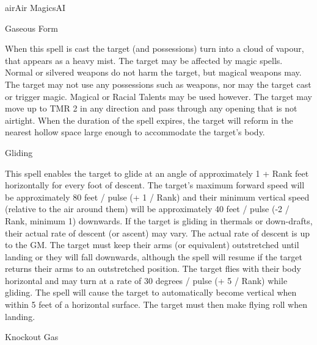 \begin{college}[2.1]{air}{Air Magics}{AI}
\begin{spell}[S-7]{Gaseous Form}

\begin{effects}
When this spell is cast the target (and possessions) turn into a cloud
of vapour, that appears as a heavy mist. The target may be affected by
magic spells. Normal or silvered weapons do not harm the target, but
magical weapons may. The target may not use any possessions such as
weapons, nor may the target cast or trigger magic. Magical or Racial
Talents may be used however. The target may move up to TMR 2 in any
direction and pass through any opening that is not airtight. When the
duration of the spell expires, the target will reform in the nearest
hollow space large enough to accommodate the target's body.
\end{effects}
\end{spell}

\begin{spell}[S-8]{Gliding}

\begin{effects}
This spell enables the target to glide at an angle of approximately 1
+ Rank feet horizontally for every foot of descent. The target's
maximum forward speed will be approximately 80 feet / pulse (+ 1 /
Rank) and their minimum vertical speed (relative to the air around
them) will be approximately 40 feet / pulse (-2 / Rank, minimum 1)
downwards. If the target is gliding in thermals or down-drafts, their
actual rate of descent (or ascent) may vary. The actual rate of
descent is up to the GM. The target must keep their arms (or
equivalent) outstretched until landing or they will fall downwards,
although the spell will resume if the target returns their arms to an
outstretched position. The target flies with their body horizontal and
may turn at a rate of 30 degrees / pulse (+ 5 / Rank) while
gliding. The spell will cause the target to automatically become
vertical when within 5 feet of a horizontal surface. The target must
then make flying roll when landing.
\end{effects}
\end{spell}

\begin{spell}[S-9]{Knockout Gas}


\end{spell}
\end{college}
